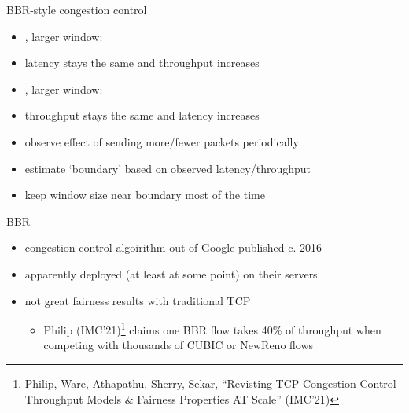 \begin{frame}{BBR-style congestion control}
    \begin{itemize}
    \item {}, larger window:
    \item latency stays the same and throughput increases
    \vspace{.5cm}
    \item {}, larger window:
    \item throughput stays the same and latency increases
    \vspace{.5cm}
    \item<4-> observe effect of sending more/fewer packets periodically
    \item<4-> estimate `boundary' based on observed latency/throughput
    \item<4-> keep window size near boundary most of the time
    \end{itemize}
\end{frame}


\begin{frame}{BBR}
\begin{itemize}
\item congestion control algoirithm out of Google published c. 2016
\item apparently deployed (at least at some point) on their servers
\vspace{.5cm}
\item not great fairness results with traditional TCP
    \begin{itemize}
    \item Philip (IMC'21)\footnote{Philip, Ware, Athapathu, Sherry, Sekar, ``Revisting TCP Congestion Control Throughput Models \& Fairness Properties AT Scale'' (IMC'21)} claims one BBR flow takes 40\% of throughput when competing with thousands of CUBIC or NewReno flows
    \end{itemize}
\end{itemize}
\end{frame}
